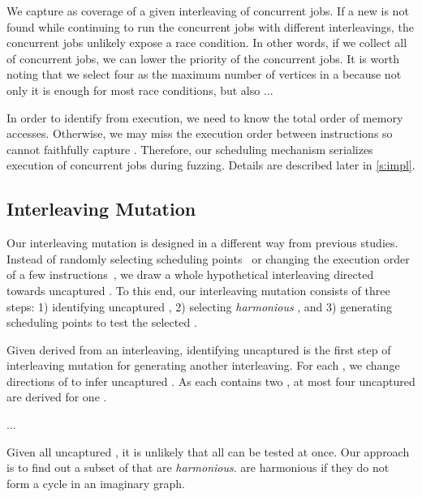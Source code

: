 We capture \segments as coverage of a given interleaving of concurrent
jobs.
%
If a new \segment is not found while continuing to run the concurrent
jobs with different interleavings, the concurrent jobs unlikely expose
a race condition. In other words, if we collect all \segments of
concurrent jobs, we can lower the priority of the concurrent jobs.
%
It is worth noting that we select four as the maximum number of
vertices in a \segment because not only it is enough for most race
conditions, but also \dr{}...

In order to identify \segments from execution, we need to know the
total order of memory accesses. Otherwise, we may miss the execution
order between instructions so cannot faithfully capture \segments.
%
Therefore, our scheduling mechanism serializes execution of concurrent
jobs during fuzzing. Details are described later in \autoref{s:impl}.


\subsection{Interleaving Mutation}
\label{ss:scheduler}


Our interleaving mutation is designed in a different way from previous
studies.
% 
Instead of randomly selecting scheduling points~\cite{krace, ski} or
changing the execution order of a few instructions~\cite{razzer,
  snowboard}, we draw a whole hypothetical interleaving directed
towards uncaptured \segments.
%
To this end, our interleaving mutation consists of three steps:
%
1) identifying uncaptured \segments, 2) selecting \textit{harmonious}
\segments, and 3) generating scheduling points to test the selected
\segments.

%
Given \segments derived from an interleaving, identifying uncaptured
\segments is the first step of interleaving mutation for generating
another interleaving.
%
For each \segment, we change directions of \mutables to infer
uncaptured \segments.
%
As each \segment contains two \mutables, at most four uncaptured
\segments are derived for one \segment.

...






%
Given all uncaptured \segments, it is unlikely that all \segments can
be tested at once.
%
Our approach is to find out a subset of \segments that are
\textit{harmonious}. \Segments are harmonious if they do not form a
cycle in an imaginary graph.


